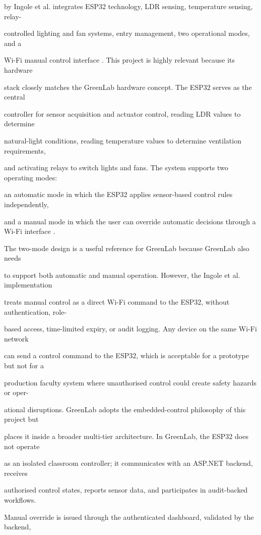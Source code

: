 by Ingole et al. integrates ESP32 technology, LDR sensing, temperature sensing, relay-

controlled lighting and fan systems, entry management, two operational modes, and a

Wi-Fi manual control interface \cite{ingole2024}. This project is highly relevant because its hardware

stack closely matches the GreenLab hardware concept. The ESP32 serves as the central

controller for sensor acquisition and actuator control, reading LDR values to determine

natural-light conditions, reading temperature values to determine ventilation requirements,

and activating relays to switch lights and fans. The system supports two operating modes:

an automatic mode in which the ESP32 applies sensor-based control rules independently,

and a manual mode in which the user can override automatic decisions through a Wi-Fi interface \cite{ingole2024}.

The two-mode design is a useful reference for GreenLab because GreenLab also needs

to support both automatic and manual operation. However, the Ingole et al. implementation

treats manual control as a direct Wi-Fi command to the ESP32, without authentication, role-

based access, time-limited expiry, or audit logging. Any device on the same Wi-Fi network

can send a control command to the ESP32, which is acceptable for a prototype but not for a

production faculty system where unauthorised control could create safety hazards or oper-

ational disruptions. GreenLab adopts the embedded-control philosophy of this project but

places it inside a broader multi-tier architecture. In GreenLab, the ESP32 does not operate

as an isolated classroom controller; it communicates with an ASP.NET backend, receives

authorised control states, reports sensor data, and participates in audit-backed workﬂows.

Manual override is issued through the authenticated dashboard, validated by the backend,

